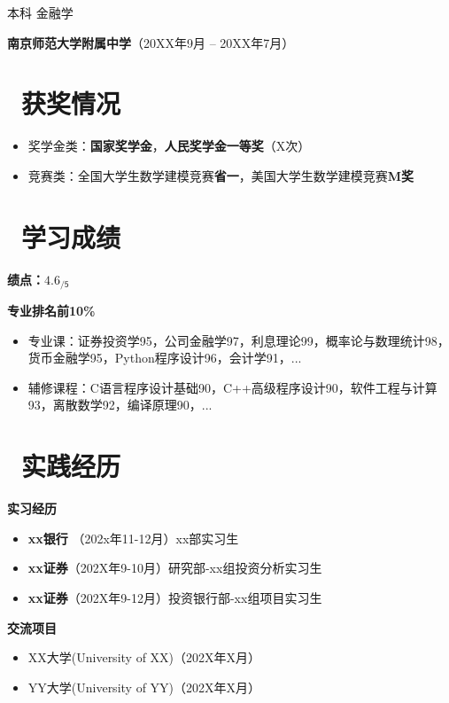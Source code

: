 \documentclass[11pt]{article}
\begin{document}
\qquad 本科 \quad 金融学

\textbf{南京师范大学附属中学}（20XX年9月 -- 20XX年7月） %

\section{\makebox[\widthof{\faGraduationCap}][c]{\color{njuviolet}\faTrophy}\ 获奖情况}
\begin{itemize}
	\item 奖学金类：\textbf{国家奖学金}，\textbf{人民奖学金一等奖}（X次）
	\item 竞赛类：全国大学生数学建模竞赛\textbf{省一}，美国大学生数学建模竞赛\textbf{M奖}
\end{itemize}


\section{\makebox[\widthof{\faGraduationCap}][c]{\color{njuviolet}\faFileText}\ 学习成绩}
\textbf{绩点：$\mathsf{4.6_{/5}}$} \

\textbf{专业排名前10\%}
\begin{itemize}[parsep=0.5ex]
	\item 专业课：证券投资学95，公司金融学97，利息理论99，概率论与数理统计98，货币金融学95，Python程序设计96，会计学91，...
	\item 辅修课程：C语言程序设计基础90，C++高级程序设计90，软件工程与计算93，离散数学92，编译原理90，...
\end{itemize}


\section{\makebox[\widthof{\faGraduationCap}][c]{\color{njuviolet}\faUniversity}\ 实践经历}
\textbf{实习经历}
\begin{itemize}
	\item \textbf{xx银行} （202x年11-12月）xx部实习生
	\item \textbf{xx证券}（202X年9-10月）研究部-xx组投资分析实习生
	\item \textbf{xx证券}（202X年9-12月）投资银行部-xx组项目实习生
\end{itemize}

\textbf{交流项目}
\begin{itemize}
	\item XX大学(University of XX)（202X年X月）
	\item YY大学(University of YY)（202X年X月）
\end{itemize}
\end{document}
